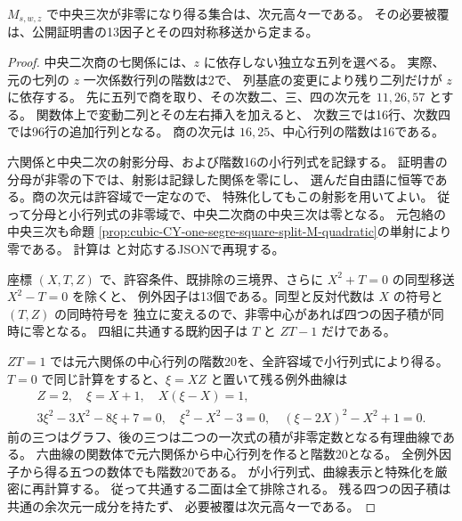 \begin{proposition}\label{prop:cubic-CY-one-segre-square-split-M-curves}
$M_{s,w,z}$ で中央三次が非零になり得る集合は、次元高々一である。
その必要被覆は、公開証明書の13因子とその四対称移送から定まる。
\end{proposition}
\begin{proof}
中央二次商の七関係には、$z$ に依存しない独立な五列を選べる。
実際、元の七列の $z$ 一次係数行列の階数は2で、
列基底の変更により残り二列だけが $z$ に依存する。
先に五列で商を取り、その次数二、三、四の次元を $11,26,57$ とする。
関数体上で変動二列とその左右挿入を加えると、
次数三では16行、次数四では96行の追加行列となる。
商の次元は $16,25$、中心行列の階数は16である。

六関係と中央二次の射影分母、および階数16の小行列式を記録する。
証明書の分母が非零の下では、射影は記録した関係を零にし、
選んだ自由語に恒等である。商の次元は許容域で一定なので、
特殊化してもこの射影を用いてよい。
従って分母と小行列式の非零域で、中央二次商の中央三次は零となる。
元包絡の中央三次も命題
\ref{prop:cubic-CY-one-segre-square-split-M-quadratic}の単射により零である。
計算は 
と対応するJSONで再現する。

座標 $(X,T,Z)$ で、許容条件、既排除の三境界、さらに
$X^2+T=0$ の同型移送 $X^2-T=0$ を除くと、
例外因子は13個である。同型と反対代数は $X$ の符号と $(T,Z)$ の同時符号を
独立に変えるので、非零中心があれば四つの因子積が同時に零となる。
四組に共通する既約因子は $T$ と $ZT-1$ だけである。

$ZT=1$ では元六関係の中心行列の階数20を、全許容域で小行列式により得る。
$T=0$ で同じ計算をすると、$\xi=XZ$ と置いて残る例外曲線は
\[
\begin{gathered}
 Z=2,\quad \xi=X+1,\quad X(\xi-X)=1,\\
 3\xi^2-3X^2-8\xi+7=0,\quad
 \xi^2-X^2-3=0,\quad (\xi-2X)^2-X^2+1=0.
\end{gathered}
\]
前の三つはグラフ、後の三つは二つの一次式の積が非零定数となる有理曲線である。
六曲線の関数体で元六関係から中心行列を作ると階数20となる。
全例外因子から得る五つの数体でも階数20である。
が小行列式、曲線表示と特殊化を厳密に再計算する。
従って共通する二面は全て排除される。
残る四つの因子積は共通の余次元一成分を持たず、
必要被覆は次元高々一である。
\end{proof}

